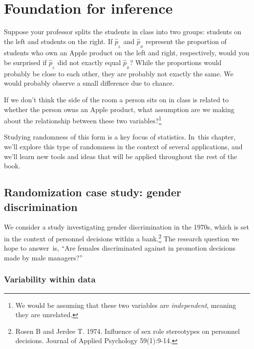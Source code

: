 
\chapter{Foundation for inference}
\label{FoundationForInference}

\begin{example}{Suppose your professor splits the students in class into two groups: students on the left and students on the right. If $\hat{p}_{_L}$ and $\hat{p}_{_R}$ represent the proportion of students who own an Apple product on the left and right, respectively, would you be surprised if $\hat{p}_{_L}$ did not {exactly} equal $\hat{p}_{_R}$?}\label{classRightLeftSideApple}
While the proportions would probably be close to each other, they are probably not exactly the same. We would probably observe a small difference due to {chance}.
\end{example}

\begin{exercise}
If we don't think the side of the room a person sits on in class is related to whether the person owns an Apple product, what assumption are we making about the relationship between these two variables?\footnote{We would be assuming that these two variables are \emph{independent}, meaning they are unrelated.}
\end{exercise}

Studying randomness of this form is a key focus of statistics. In~this chapter, we'll explore this type of randomness in the context of several applications, and we'll learn new tools and ideas that will be applied throughout the rest of the book.



\section{Randomization case study: gender discrimination}
\label{caseStudyGenderDiscrimination}


We consider a study investigating gender discrimination in the 1970s, which is set in the context of personnel decisions within a bank.\footnote{Rosen B and Jerdee T. 1974. Influence of sex role stereotypes on personnel decisions. Journal of Applied Psychology 59(1):9-14.} The research question we hope to answer~is, ``Are females discriminated against in promotion decisions made by male managers?''

\subsection{Variability within data}
\label{variabilityWithinData}

